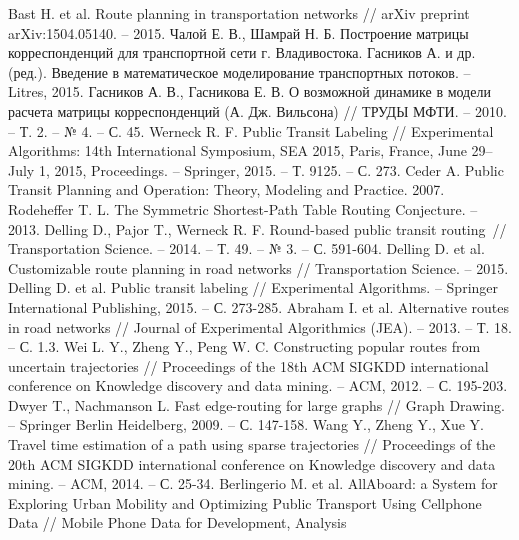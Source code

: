 \begin{thebibliography}{10}
     Bast H. et al. Route planning in transportation networks //
        arXiv preprint arXiv:1504.05140. -- 2015.
     Чалой Е. В., Шамрай Н. Б. Построение матрицы корреспонденций для транспортной 
        сети г. Владивостока.
     Гасников А. и др. (ред.). Введение в математическое моделирование транспортных 
        потоков. -- Litres, 2015.
     Гасников А. В., Гасникова Е. В. О возможной динамике в модели расчета матрицы 
        корреспонденций (А. Дж. Вильсона) // ТРУДЫ МФТИ. -- 2010. -- Т. 2. -- № 4. -- С. 45.
     Werneck R. F. Public Transit Labeling // Experimental Algorithms: 
        14th International Symposium, SEA 2015, Paris, France, June 29–July 1, 2015, 
        Proceedings. -- Springer, 2015. -- Т. 9125. -- С. 273.
     Ceder A. Public Transit Planning and Operation: Theory, Modeling and Practice. 2007.
     Rodeheffer T. L. The Symmetric Shortest-Path Table Routing 
        Conjecture. -- 2013.
     Delling D., Pajor T., Werneck R. F. Round-based public transit routing~//
        Transportation Science. -- 2014. -- Т. 49. -- № 3. -- С. 591-604.
     Delling D. et al. Customizable route planning in road networks //
        Transportation Science. -- 2015.
     Delling D. et al. Public transit labeling // Experimental Algorithms. -- 
        Springer International Publishing, 2015. -- С. 273-285.
     Abraham I. et al. Alternative routes in road networks // Journal of 
        Experimental Algorithmics (JEA). -- 2013. -- Т. 18. -- С. 1.3.
     Wei L. Y., Zheng Y., Peng W. C. Constructing popular routes from 
        uncertain trajectories // Proceedings of the 18th ACM SIGKDD international conference on 
        Knowledge discovery and data mining. -- ACM, 2012. -- С. 195-203.
     Dwyer T., Nachmanson L. Fast edge-routing for large graphs // 
        Graph Drawing. -- Springer Berlin Heidelberg, 2009. -- С. 147-158.
     Wang Y., Zheng Y., Xue Y. Travel time estimation of a path using sparse 
        trajectories // Proceedings of the 20th ACM SIGKDD international conference on Knowledge 
        discovery and data mining. -- ACM, 2014. -- С. 25-34.
     Berlingerio M. et al. AllAboard: a System for Exploring Urban Mobility and 
        Optimizing Public Transport Using Cellphone Data // Mobile Phone Data for Development, Analysis 

\end{thebibliography}
